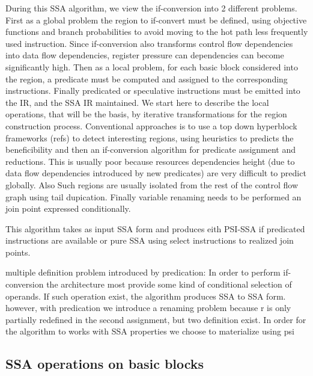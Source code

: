 During this SSA algorithm, we view the if-conversion into 2 different problems. First as a global problem the region to if-convert must be defined, using objective functions and branch probabilities to avoid moving to the hot path less frequently used instruction. Since if-conversion also transforms control flow dependencies into data flow dependencies, register pressure can dependencies can become significantly high.
Then as a local problem, for each basic block considered into the region, a predicate must be computed and assigned to the corresponding instructions. Finally predicated or speculative instructions must be emitted into the IR, and the SSA IR maintained.
We start here to describe the local operations, that will be the basis, by iterative transformations for the region construction process. Conventional approaches is to use a top down hyperblock frameworks (refs) to detect interesting regions, using heuristics to predicts the beneficibility and then an if-conversion algorithm for predicate assignment and reductions. This is usually poor because resources dependencies height (due to data flow dependencies introduced by new predicates) are very difficult to predict globally. Also Such regions are usually isolated from the rest of the control flow graph using tail dupication. Finally variable renaming needs to be performed an join point expressed conditionally. 

This algorithm takes as input SSA form and produces eith PSI-SSA if predicated instructions are available or pure SSA using select instructions to realized join points.

multiple definition problem introduced by predication: In order to perform if-conversion the architecture most provide some kind of conditional selection of operands. If such operation exist, the algorithm produces SSA to SSA form.
however, with predication we introduce a renaming problem because r is only partially redefined in the second assignment, but two definition exist. In order for the algorithm to works with SSA properties we choose to materialize using psi

\subsection{SSA operations on basic blocks}

